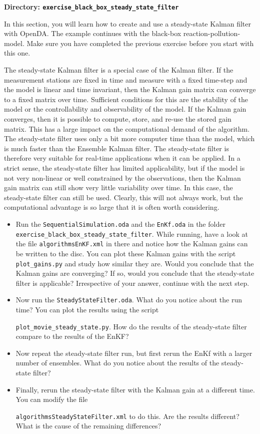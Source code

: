 {\bf Directory: {\tt exercise\_black\_box\_steady\_state\_filter}}

  In this section, you will learn how to create and use a steady-state Kalman
  filter with OpenDA. The example continues with the black-box reaction-pollution-model. Make sure you have completed the previous exercise before you start with this one.

  The steady-state Kalman filter is a special case of the Kalman filter. If the measurement stations are fixed in time and measure with a fixed time-step and the model is linear and time invariant, then the Kalman gain matrix can converge to a fixed matrix over time. Sufficient conditions for this are the stability of the model or the controllability and observability of the model. If the Kalman gain converges, then it is possible to compute, store, and re-use the stored gain matrix. This has a large impact on the computational demand of the algorithm. The steady-state filter uses only a bit more computer time than the model, which is much faster than the Ensemble Kalman filter. The steady-state filter is therefore very suitable for real-time applications when it can be applied. In a strict sense, the steady-state filter has limited applicability, but if the model is not very non-linear or well constrained by the observations, then the Kalman gain matrix can still show very little variability over time. In this case, the steady-state filter can still be used. Clearly, this will not always work, but the computational advantage is so large that it is often worth considering.


\begin{itemize}
\item Run the {\tt SequentialSimulation.oda} and the {\tt EnKf.oda} in the folder {\tt exercise\_black\_box\_steady\_state\_filter}. While running, have a look at the file {\tt algorithms\/EnKF.xml} in there and notice how the Kalman gains can be written to the disc. You can plot these Kalman gains with the script {\tt plot\_gains.py} and study how similar they are. Would you conclude that the Kalman gains are converging? If so, would you conclude that the steady-state filter is applicable? Irrespective of your answer, continue with the next step.

\item Now run the {\tt SteadyStateFilter.oda}. What do you notice about the run time? You can plot the results using the script 

        {\tt plot\_movie\_steady\_state.py}. How do the results of the steady-state filter compare to the results of the EnKF? 

\item  Now repeat the steady-state filter run, but first rerun the EnKf with a larger number of ensembles. What do you notice about the results of the steady-state filter?

\item Finally, rerun the steady-state filter with the Kalman gain at a different time. You can modify the file 

        {\tt algorithms\/SteadyStateFilter.xml} to do this. Are the results different? What is the cause of the remaining differences?
\end{itemize}
